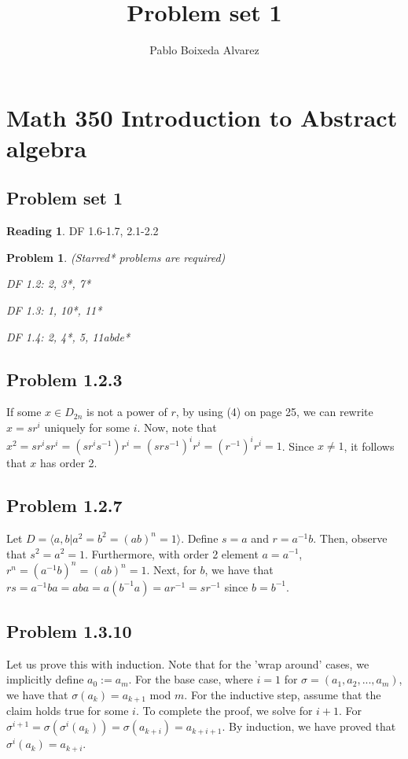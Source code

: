\documentclass[11 pt]{article}
\title{Problem set 1}
\author{Pablo Boixeda Alvarez}
\newtheorem{Prob}{Problem}
\theoremstyle{definition}
\newtheorem{re}{Reading}
\theoremstyle{remark}
\begin{document}
\section*{Math 350 Introduction to Abstract algebra}
\subsection*{Problem set 1}

\begin{re}
	DF 1.6-1.7, 2.1-2.2
\end{re}
\begin{Prob} (Starred* problems are required)
	
	DF 1.2: 2, 3*, 7*
	
	DF 1.3: 1, 10*, 11*
	
	DF 1.4: 2, 4*, 5, 11abde*
\end{Prob}

\subsection*{Problem 1.2.3}
If some $x \in D_{2n}$ is not a power of $r$, by using (4) on page 25, we can rewrite $x = sr^i$ uniquely for some $i$. Now, note that $x^2 = sr^isr^i = (sr^is^{-1})r^i = (srs^{-1})^ir^i= (r^{-1})^ir^i= 1$. Since $x \neq 1$, it follows that $x$ has order 2. 

\subsection*{Problem 1.2.7}
Let $D = \langle a,b | a^2=b^2=(ab)^n=1\rangle$. Define $s=a$ and $r=a^{-1}b$. Then, observe that $s^2=a^2=1$. Furthermore, with order 2 element $a=a^{-1}$, $r^n=(a^{-1}b)^n = (ab)^n = 1$. Next, for $b$, we have that $rs = a^{-1}ba = aba = a(b^{-1}a) = ar^{-1} = sr^{-1}$ since $b=b^{-1}$. 
\subsection*{Problem 1.3.10}
Let us prove this with induction. Note that for the 'wrap around' cases, we implicitly define $a_0 := a_m$. For the base case, where $i=1$ for $\sigma = (a_1, a_2, ..., a_m)$, we have that $\sigma(a_k) = a_{k+1}$ mod $m$. For the inductive step, assume that the claim holds true for some $i$. To complete the proof, we solve for $i+1$. For $\sigma^{i+1} = \sigma(\sigma^i(a_k)) = \sigma(a_{k+i}) = a_{k+i+1}$. By induction, we have proved that $\sigma^i(a_k)=a_{k+i}$.
\end{document}
